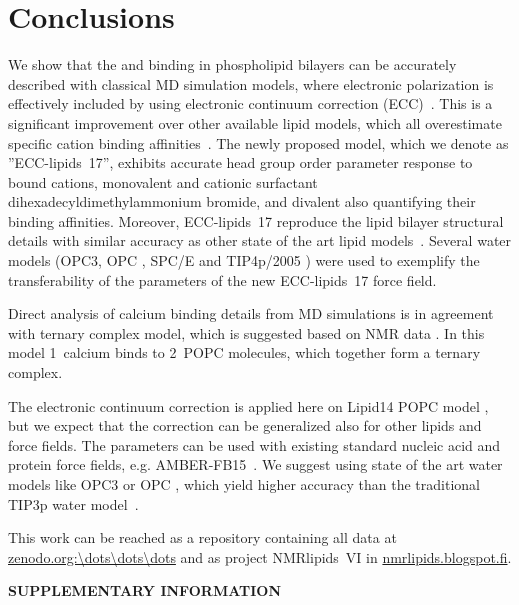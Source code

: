 \documentclass[aip,jcp,twocolumn]{revtex4}
\begin{document}
\section{Conclusions}
We show that the  and  binding in phospholipid bilayers can
be accurately described with classical MD simulation models, where electronic
polarization is effectively included by using electronic continuum correction (ECC)~\cite{leontyev11}.
This is a significant improvement over other available lipid models,
which all overestimate specific cation binding affinities~\cite{catte16}.  
The newly proposed model, which we denote as ''ECC-lipids~17'', 
exhibits accurate head group order parameter response to
bound cations, monovalent  and cationic surfactant dihexadecyldimethylammonium bromide, 
and divalent 
also quantifying their binding affinities.
Moreover, ECC-lipids~17 reproduce the lipid bilayer structural details
with similar accuracy as other state of the art lipid models~\cite{catte16}.
Several water models 
(OPC3\cite{Izadi16}, OPC \cite{Izadi14}, SPC/E \cite{Berendsen1987} and TIP4p/2005 \cite{Abascal2005}) 
were used to exemplify the transferability of 
the parameters of the new ECC-lipids~17 force field. 

Direct analysis of calcium binding details from MD simulations is in agreement
with ternary complex model, which is suggested based on NMR data \cite{altenbach84}.
In this model 1~calcium binds to 2~POPC molecules, which together form a ternary
complex.

The electronic continuum correction is applied here on Lipid14 POPC model \cite{dickson14},
but we expect that the correction can be generalized also for other lipids
and force fields.
The parameters can be used with existing standard nucleic acid and protein force fields, e.g. AMBER-FB15~\cite{Wang2017}. 
We suggest using state of the art water models like OPC3\cite{Izadi16} or OPC \cite{Izadi14},
which yield higher accuracy than the traditional TIP3p water model~\cite{jorgensen83}.


This work can be reached as a repository containing all data at \url{zenodo.org:\dots\dots\dots} and as project \mbox{NMRlipids~VI} in \url{nmrlipids.blogspot.fi}.



\begin{acknowledgments}
\end{acknowledgments}
\newpage
\appendix
\begin{center}
{\bf SUPPLEMENTARY INFORMATION}
\end{center}
\end{document}
